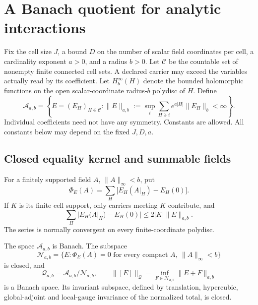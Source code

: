 \section{A Banach quotient for analytic interactions}
\label{aqb-section}

Fix the cell size $J$, a bound $D$ on the number of scalar field
coordinates per cell, a cardinality exponent $a>0$, and a radius
$b>0$. Let $\mathcal C$ be the countable set of nonempty finite
connected cell sets. A declared carrier may exceed the variables
actually read by its coefficient. Let $H^\infty_b(H)$ denote the
bounded holomorphic functions on the open scalar-coordinate
radius-$b$ polydisc of $H$. Define
\begin{equation}
 \mathcal A_{a,b}=\left\{E=(E_H)_{H\in\mathcal C}:
 \|E\|_{a,b}:=\sup_i\sum_{H\ni i}e^{a|H|}
                       \|E_H\|_b<\infty\right\}.
 \label{aqb-activity-space}
\end{equation}
Individual coefficients need not have any symmetry. Constants
are allowed. All constants below may depend on the fixed $J,D,a$.

\subsection{Closed equality kernel and summable fields}
\label{aqb-quotient-section}

For a finitely supported field $A$, $\|A\|_\infty<b$, put
\begin{equation}
 \Phi_E(A)=\sum_H\bigl[E_H(A|_H)-E_H(0)\bigr].
 \label{aqb-total}
\end{equation}
If $K$ is its finite cell support, only carriers meeting $K$
contribute, and
\begin{equation}
 \sum_H|E_H(A|_H)-E_H(0)|\le2|K|\|E\|_{a,b}.
 \label{aqb-evaluation-bound}
\end{equation}
The series is normally convergent on every finite-coordinate
polydisc.

\begin{proposition}
\label{aqb-quotient-proposition}
The space $\mathcal A_{a,b}$ is Banach. The subspace
\begin{equation}
 \mathcal N_{a,b}=\{E:\Phi_E(A)=0
                  \text{ for every compact }A,\ \|A\|_\infty<b\}
 \label{aqb-null-space}
\end{equation}
is closed, and
\begin{equation}
 \mathcal Q_{a,b}=\mathcal A_{a,b}/\mathcal N_{a,b},
 \qquad
 \|[E]\|_{\mathcal Q}=\inf_{F\in\mathcal N_{a,b}}
                                      \|E+F\|_{a,b}
 \label{aqb-quotient-norm}
\end{equation}
is a Banach space. Its invariant subspace, defined by translation,
hypercubic, global-adjoint and local-gauge invariance of the
normalized total, is closed.
\end{proposition}

